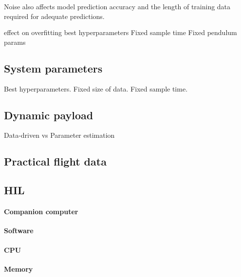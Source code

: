 
        Noise also affects model prediction accuracy and the length of training data required for adequate predictions. 
        

        effect on overfitting
        best hyperparameters
        Fixed sample time
        Fixed pendulum params
    
    \subsection{System parameters}
        Best hyperparameters.
        Fixed size of data.
        Fixed sample time.

    \subsection{Dynamic payload}
        Data-driven vs Parameter estimation

    \subsection{Practical flight data}
    \subsection{HIL}
        \paragraph{Companion computer}
        \paragraph{Software}
        \paragraph{CPU}
        \paragraph{Memory}

